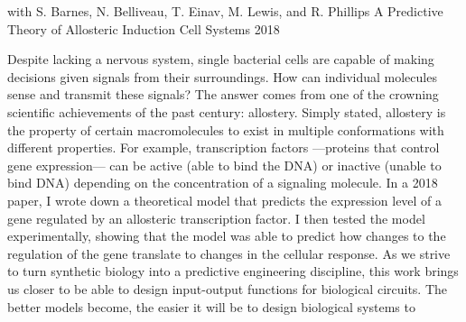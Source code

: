 


\begin{cventries}

      \cventry
        {with S. Barnes, N. Belliveau, T. Einav, M. Lewis, and R. Phillips} %
        {A Predictive Theory of Allosteric Induction} %
        {Cell Systems} %
        {2018} %
        {
          \begin{cvitems} %
            \item {
            \begin{flushleft}
            Despite lacking a nervous system, single bacterial cells are
            capable of making decisions given signals from their surroundings.
            How can individual molecules sense and transmit these signals? The
            answer comes from one of the crowning scientific achievements of the
            past century: allostery. Simply stated, allostery is the property of
            certain macromolecules to exist in multiple conformations with
            different properties. For example, transcription factors —proteins
            that control gene expression— can be active (able to bind the DNA)
            or inactive (unable to bind DNA) depending on the concentration of a
            signaling molecule.\linebreak
            In a 2018 paper, I wrote down a theoretical model that predicts the
            expression level of a gene regulated by an allosteric transcription
            factor. I then tested the model experimentally, showing that the
            model was able to predict how changes to the regulation of the gene
            translate to changes in the cellular response.\linebreak
            As we strive to turn synthetic biology into a predictive engineering
            discipline, this work brings us closer to be able to design
            input-output functions for biological circuits. The better models
            become, the easier it will be to design biological systems to

\end{flushleft}}
\end{cvitems}}
\end{cventries}
